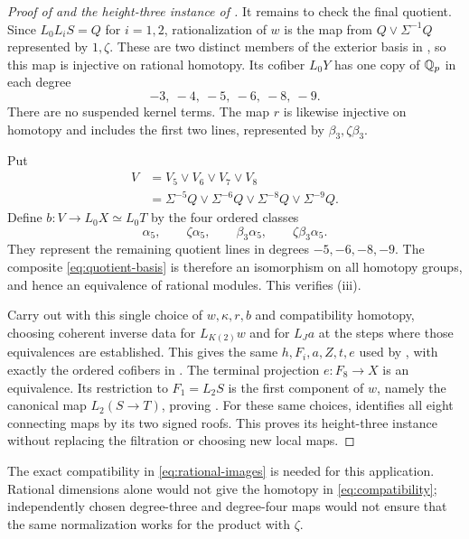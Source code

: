 \begin{proof}[Proof of  and the height-three instance of
]
It remains to check the final quotient.  Since \(L_0L_iS=Q\)
for \(i=1,2\), rationalization of \(w\) is the map from
\(Q\vee\Sigma^{-1}Q\) represented by \(1,\zeta\).
These are two distinct members of the exterior basis in
, so this map is injective
on rational homotopy.  Its cofiber \(L_0Y\) has one copy of
\(\mathbb Q_p\) in each degree
\[
 -3,\ -4,\ -5,\ -6,\ -8,\ -9.
\]
There are no suspended kernel terms.  The map \(r\) is likewise
injective on homotopy and includes the first two lines, represented
by \(\beta_3,\zeta\beta_3\).

Put
\[
\begin{aligned}
 V&=V_5\vee V_6\vee V_7\vee V_8\\
  &=\Sigma^{-5}Q\vee\Sigma^{-6}Q
       \vee\Sigma^{-8}Q\vee\Sigma^{-9}Q.
\end{aligned}
\]
Define \(b:V\to L_0X\simeq L_0T\) by the four ordered classes
\begin{equation}\label{eq:rational-basis-application}
 \alpha_5,\qquad \zeta\alpha_5,\qquad
 \beta_3\alpha_5,\qquad\zeta\beta_3\alpha_5.
\end{equation}
They represent the remaining quotient lines in degrees
\(-5,-6,-8,-9\).  The composite \eqref{eq:quotient-basis}
is therefore an isomorphism on all homotopy groups, and hence
an equivalence of rational modules.  This verifies
\textup{(iii)}.

Carry out  with this single choice of
\(w,\kappa,r,b\) and compatibility homotopy, choosing coherent
inverse data for \(L_{K(2)}w\) and for \(L_Ja\) at the steps where
those equivalences are established.  This gives the same
\(h,F_i,a,Z,t,e\) used by ,
with exactly the ordered cofibers in .
The terminal projection \(e:F_8\to X\) is an equivalence.  Its
restriction to \(F_1=L_2S\) is the first component of \(w\),
namely the canonical map \(L_2(S\to T)\), proving .
For these same choices, 
identifies all eight connecting maps by its two signed roofs.
This proves its height-three instance without replacing the
filtration or choosing new local maps.
\end{proof}

\begin{remark}
The exact compatibility in \eqref{eq:rational-images} is needed
for this application.  Rational dimensions alone would not give
the homotopy in \eqref{eq:compatibility}; independently chosen
degree-three and degree-four maps would not ensure that the same
normalization works for the product with \(\zeta\).
\end{remark}
